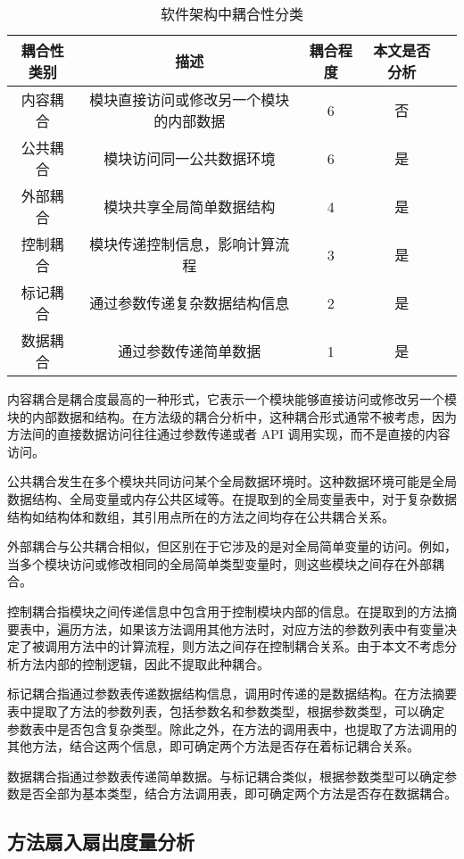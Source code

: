 \begin{table}[htbp]
\caption{软件架构中耦合性分类}
\vspace{0.5em}\centering\wuhao
\begin{tabular}{ccccc}
\toprule
耦合性类别 & 描述 & 耦合程度 & 本文是否分析 \\
\midrule
内容耦合 & 模块直接访问或修改另一个模块的内部数据 & 6 & 否\\
公共耦合 & 模块访问同一公共数据环境 & 6 & 是 \\
外部耦合 & 模块共享全局简单数据结构 & 4 & 是 \\
控制耦合 & 模块传递控制信息，影响计算流程 & 3 & 是 \\
标记耦合 & 通过参数传递复杂数据结构信息 & 2 & 是 \\
数据耦合 & 通过参数传递简单数据 & 1 & 是 \\
\bottomrule
\end{tabular}
\end{table}


内容耦合是耦合度最高的一种形式，它表示一个模块能够直接访问或修改另一个模块的内部数据和结构。在方法级的耦合分析中，这种耦合形式通常不被考虑，因为方法间的直接数据访问往往通过参数传递或者 API 调用实现，而不是直接的内容访问。

公共耦合发生在多个模块共同访问某个全局数据环境时。这种数据环境可能是全局数据结构、全局变量或内存公共区域等。在提取到的全局变量表中，对于复杂数据结构如结构体和数组，其引用点所在的方法之间均存在公共耦合关系。


外部耦合与公共耦合相似，但区别在于它涉及的是对全局简单变量的访问。例如，当多个模块访问或修改相同的全局简单类型变量时，则这些模块之间存在外部耦合。


控制耦合指模块之间传递信息中包含用于控制模块内部的信息。在提取到的方法摘
要表中，遍历方法，如果该方法调用其他方法时，对应方法的参数列表中有变量决定了被调用方法中的计算流程，则方法之间存在控制耦合关系。由于本文不考虑分析方法内部的控制逻辑，因此不提取此种耦合。


标记耦合指通过参数表传递数据结构信息，调用时传递的是数据结构。在方法摘要
表中提取了方法的参数列表，包括参数名和参数类型，根据参数类型，可以确定
参数表中是否包含复杂类型。除此之外，在方法的调用表中，也提取了方法调用的
其他方法，结合这两个信息，即可确定两个方法是否存在着标记耦合关系。


数据耦合指通过参数表传递简单数据。与标记耦合类似，根据参数类型可以确定参
数是否全部为基本类型，结合方法调用表，即可确定两个方法是否存在数据耦合。
\subsection{方法扇入扇出度量分析}

